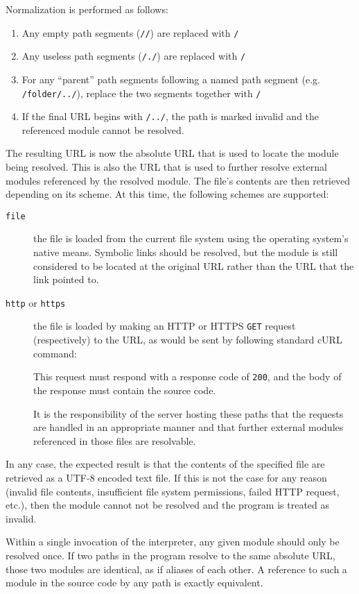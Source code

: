 \noindent
Normalization is performed as follows:

\begin{enumerate}
    \item Any empty path segments (\texttt{//}) are replaced with \texttt{/}
    \item Any useless path segments (\texttt{/./}) are replaced with \texttt{/}
    \item For any ``parent'' path segments following a named path segment
    (e.g. \texttt{/folder/../}), replace the two segments together with \texttt{/}
    \item If the final URL begins with \texttt{/../}, the path is marked invalid and
    the referenced module cannot be resolved.
\end{enumerate}

The resulting URL is now the absolute URL that is used to locate the module being
resolved. This is also the URL that is used to further resolve external modules
referenced by the resolved module. The file's contents are then retrieved depending
on its scheme. At this time, the following schemes are supported:

\begin{description}
    \item[\texttt{file}] the file is loaded from the current file system using
    the operating system's native means. Symbolic links should be resolved, but
    the module is still considered to be located at the original URL rather than
    the URL that the link pointed to.
    \item[\texttt{http} or \texttt{https}] the file is loaded by
    making an HTTP or HTTPS \texttt{GET} request (respectively) to the URL, as
    would be sent by following standard cURL command:

    

    This request must respond with a response code of \texttt{200}, and the
    body of the response must contain the \Trilogy{} source code.

    It is the responsibility of the server hosting these paths that the requests
    are handled in an appropriate manner and that further external modules referenced
    in those files are resolvable.
\end{description}

In any case, the expected result is that the contents of the specified \Trilogy{}
file are retrieved as a UTF-8 encoded text file. If this is not the case for any
reason (invalid file contents, insufficient file system permissions, failed HTTP
request, etc.), then the module cannot not be resolved and the program is treated
as invalid.

Within a single invocation of the \Trilogy{} interpreter, any given module should
only be resolved once. If two paths in the program resolve to the same absolute
URL, those two modules are identical, as if aliases of each other. A reference to
such a module in the source code by any path is exactly equivalent.

